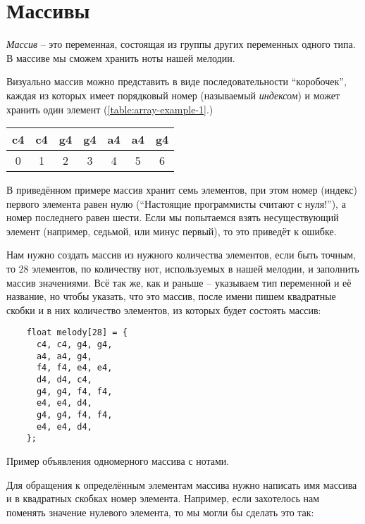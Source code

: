 \documentclass[../sparc.tex]{subfiles}
\begin{document}
\section{Массивы}

\emph{Массив} -- это переменная, состоящая из группы других переменных одного
типа. В массиве мы сможем хранить ноты нашей мелодии.

Визуально массив можно представить в виде последовательности ``коробочек'',
каждая из которых имеет порядковый номер (называемый \emph{индексом}) и может
хранить один элемент (\ref{table:array-example-1}.)

\begin{tabular}{|p{1cm}|p{1cm}|p{1cm}|p{1cm}|p{1cm}|p{1cm}|p{1cm}|}
  \hline
  c4 & c4 & g4 & g4 & a4 & a4 & g4 \\
  \hline
  \multicolumn{1}{c}{0}
  & \multicolumn{1}{c}{1}
  & \multicolumn{1}{c}{2}
  & \multicolumn{1}{c}{3}
  & \multicolumn{1}{c}{4}
  & \multicolumn{1}{c}{5}
  & \multicolumn{1}{c}{6}
  \label{table:array-example-1}
\end{tabular}

В приведённом примере массив хранит семь элементов, при этом номер (индекс)
первого элемента равен нулю (``Настоящие программисты считают с нуля!''), а
номер последнего равен шести. Если мы попытаемся взять несуществующий элемент
(например, седьмой, или минус первый), то это приведёт к ошибке.

Нам нужно создать массив из нужного количества элементов, если быть точным, то
28 элементов, по количеству нот, используемых в нашей мелодии, и заполнить
массив значениями. Всё так же, как и раньше -- указываем тип переменной и её
название, но чтобы указать, что это массив, после имени пишем квадратные скобки
и в них количество элементов, из которых будет состоять массив:

\begin{listing}[ht]
  \begin{verbatim}
    float melody[28] = {
      c4, c4, g4, g4,
      a4, a4, g4,
      f4, f4, e4, e4,
      d4, d4, c4,
      g4, g4, f4, f4,
      e4, e4, d4,
      g4, g4, f4, f4,
      e4, e4, d4,
    };
  \end{verbatim}
  \label{listing:music-array-example-1}
  \caption{Пример объявления одномерного массива с нотами.}
\end{listing}

Для обращения к определённым элементам массива нужно написать имя массива и в
квадратных скобках номер элемента. Например, если захотелось нам поменять
значение нулевого элемента, то мы могли бы сделать это так:
\end{document}
